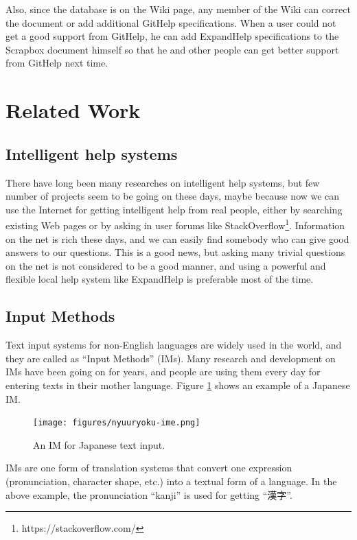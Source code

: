 \documentclass[manuscript,screen,review]{acmart}
\def\GH{\textsf{GitHelp}}
\def\EH{\textsf{ExpandHelp}}
\def\SB{\textsf{Scrapbox}}
\begin{document}
Also, since the database is on the Wiki page, any member of the
Wiki can correct the document or add additional {\GH} specifications.
When a user could not get a good support from {\GH}, he can add
{\EH} specifications to the {\SB} document himself
so that he and other people can get better support
from {\GH} next time.

\section{Related Work}

\subsection{Intelligent help systems}

There have long been many researches on
intelligent help systems\cite{Delisle:2002:UIH:606412.606415},
but few number of projects seem to be going on these days,
maybe because now we can use the Internet for getting intelligent help from
real people,
either by searching existing Web pages or 
by asking in user forums like StackOverflow\footnote{
  \textsf{https://stackoverflow.com/}
}.
Information on the net is rich these days, and we can easily
find somebody who can give good answers to our questions.
This is a good news, but 
asking many trivial questions on the net is not considered to be a
good manner, and
using a powerful and flexible local help system like {\EH} is
preferable most of the time.

\subsection{Input Methods}

Text input systems for non-English languages are widely used
in the world,
and they are called as ``Input Methods'' (IMs).
%
Many research and development on IMs have been going on for years, and
people are using them every day for entering texts in their mother language.
Figure \ref{gyaim} shows an example of a Japanese IM.

\begin{figure}[H]
  \centerline{\texttt{[image: figures/nyuuryoku-ime.png]}}
  \caption{An IM for Japanese text input.}
  \label{gyaim}
\end{figure}

IMs are one form of translation systems that convert one
expression (pronunciation, character shape, etc.)
into a textual form of a language.
In the above example, the pronunciation ``kanji''
is used for getting ``漢字''.
\end{document}
